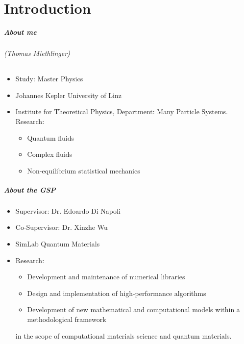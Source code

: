 








\part{Introduction}
\makepart

\begin{frame}
\frametitle{About me}
\framesubtitle{(Thomas Miethlinger)}
\begin{itemize}
  \item Study: Master Physics
  \item Johannes Kepler University of Linz
  \item Institute for Theoretical Physics, Department: Many Particle Systems. \\
        Research:
        \begin{itemize}
         \item Quantum fluids
         \item Complex fluids
         \item Non-equilibrium statistical mechanics
        \end{itemize}
\end{itemize}
\end{frame}

\begin{frame}
\frametitle{About the GSP}

\begin{itemize}
  \item Supervisor: Dr. Edoardo Di Napoli
  \item Co-Supervisor: Dr. Xinzhe Wu
  \item SimLab Quantum Materials
  \item Research:
    \begin{itemize}
    \item Development and maintenance of numerical libraries
    \item Design and implementation of high-performance algorithms
    \item Development of new mathematical and computational models within a methodological framework
    \end{itemize}
    in the scope of computational materials science and quantum materials.
\end{itemize}
\end{frame}

